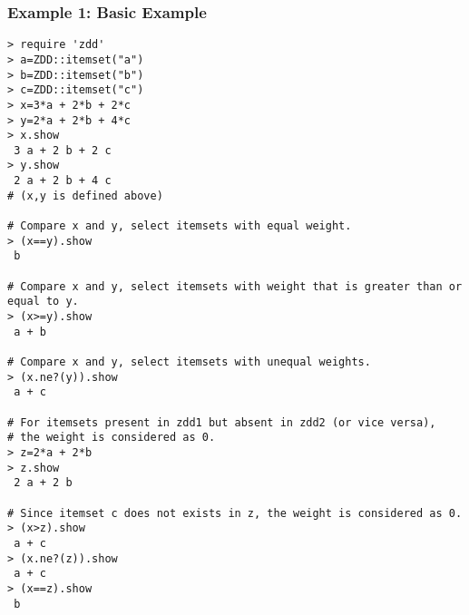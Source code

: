 \subsubsection*{Example 1: Basic Example}



\begin{Verbatim}[baselinestretch=0.7,frame=single]
> require 'zdd'
> a=ZDD::itemset("a")
> b=ZDD::itemset("b")
> c=ZDD::itemset("c")
> x=3*a + 2*b + 2*c
> y=2*a + 2*b + 4*c
> x.show
 3 a + 2 b + 2 c
> y.show
 2 a + 2 b + 4 c
# (x,y is defined above)

# Compare x and y, select itemsets with equal weight.
> (x==y).show
 b

# Compare x and y, select itemsets with weight that is greater than or equal to y.
> (x>=y).show
 a + b

# Compare x and y, select itemsets with unequal weights.
> (x.ne?(y)).show
 a + c

# For itemsets present in zdd1 but absent in zdd2 (or vice versa),
# the weight is considered as 0.
> z=2*a + 2*b
> z.show
 2 a + 2 b

# Since itemset c does not exists in z, the weight is considered as 0. 
> (x>z).show
 a + c
> (x.ne?(z)).show
 a + c
> (x==z).show
 b
\end{Verbatim}
